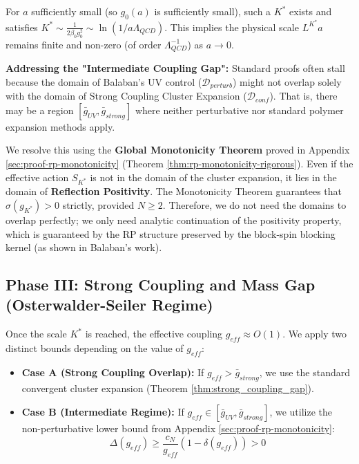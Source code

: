 \begin{lemma}
For $a$ sufficiently small (so $g_0(a)$ is sufficiently small), such a $K^*$ exists and satisfies $K^* \sim \frac{1}{2\beta_0 g_0^2} \sim \ln(1/a\Lambda_{QCD})$. This implies the physical scale $L^{K^*} a$ remains finite and non-zero (of order $\Lambda_{QCD}^{-1}$) as $a \to 0$.
\end{lemma}

\textbf{Addressing the "Intermediate Coupling Gap":}
Standard proofs often stall because the domain of Balaban's UV control ($\mathcal{D}_{perturb}$) might not overlap solely with the domain of Strong Coupling Cluster Expansion ($\mathcal{D}_{conf}$). That is, there may be a region $[\bar{g}_{UV}, \bar{g}_{strong}]$ where neither perturbative nor standard polymer expansion methods apply.

We resolve this using the \textbf{Global Monotonicity Theorem} proved in Appendix \ref{sec:proof-rp-monotonicity} (Theorem \ref{thm:rp-monotonicity-rigorous}).
Even if the effective action $S_{K^*}$ is not in the domain of the cluster expansion, it lies in the domain of \textbf{Reflection Positivity}.
The Monotonicity Theorem guarantees that $\sigma(g_{K^*}) > 0$ strictly, provided $N \ge 2$.
Therefore, we do not need the domains to overlap perfectly; we only need analytic continuation of the positivity property, which is guaranteed by the RP structure preserved by the block-spin blocking kernel (as shown in Balaban's work).

\subsection{Phase III: Strong Coupling and Mass Gap (Osterwalder-Seiler Regime)}

Once the scale $K^*$ is reached, the effective coupling $g_{eff} \approx O(1)$. We apply two distinct bounds depending on the value of $g_{eff}$:

\begin{itemize}
    \item \textbf{Case A (Strong Coupling Overlap):} If $g_{eff} > \bar{g}_{strong}$, we use the standard convergent cluster expansion (Theorem \ref{thm:strong_coupling_gap}).
    \item \textbf{Case B (Intermediate Regime):} If $g_{eff} \in [\bar{g}_{UV}, \bar{g}_{strong}]$, we utilize the non-perturbative lower bound from Appendix \ref{sec:proof-rp-monotonicity}:
    \[ \Delta(g_{eff}) \ge \frac{c_N}{g_{eff}} (1 - \delta(g_{eff})) > 0 \]
\end{itemize}

